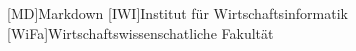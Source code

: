 
\begin{acronym}[WiFa] %

[MD]{Markdown}
[IWI]{Institut für Wirtschaftsinformatik}
[WiFa]{Wirtschaftswissenschatliche Fakultät}

\end{acronym}

